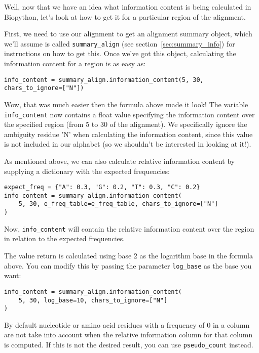 Well, now that we have an idea what information content is being calculated in Biopython, let's look at how to get it for a particular region of the alignment.

First, we need to use our alignment to get an alignment summary object, which we'll assume is called \verb|summary_align| (see section~\ref{sec:summary_info}) for instructions on how to get this. Once we've got this object, calculating the information content for a region is as easy as:

\begin{verbatim}
info_content = summary_align.information_content(5, 30, chars_to_ignore=["N"])
\end{verbatim}

Wow, that was much easier then the formula above made it look! The variable \verb|info_content| now contains a float value specifying the information content over the specified region (from 5 to 30 of the alignment). We specifically ignore the ambiguity residue 'N' when calculating the information content, since this value is not included in our alphabet (so we shouldn't be interested in looking at it!).

As mentioned above, we can also calculate relative information content by supplying a dictionary with the expected frequencies:

\begin{verbatim}
expect_freq = {"A": 0.3, "G": 0.2, "T": 0.3, "C": 0.2}
info_content = summary_align.information_content(
    5, 30, e_freq_table=e_freq_table, chars_to_ignore=["N"]
)
\end{verbatim}

Now, \verb|info_content| will contain the relative information content over the region in relation to the expected frequencies.

The value return is calculated using base 2 as the logarithm base in the formula above. You can modify this by passing the parameter \verb|log_base| as the base you want:

\begin{verbatim}
info_content = summary_align.information_content(
    5, 30, log_base=10, chars_to_ignore=["N"]
)
\end{verbatim}

By default nucleotide or amino acid residues with a frequency of 0 in a column are not take into account when the relative information column for that column is computed. If this is not the desired result, you can use \verb|pseudo_count| instead.

